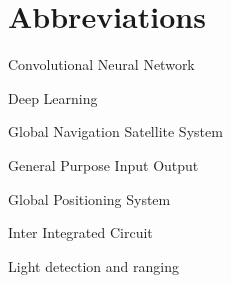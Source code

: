 \chapter*{Abbreviations}

\begin{description}
\setlength{\itemsep}{-11pt}
\setlength{\leftmargin}{900pt}

\item[CNN] Convolutional Neural Network

\item[DL] Deep Learning

\item[GNNS] Global Navigation Satellite System
\item[GPIO] General Purpose Input Output
\item[GPS] Global Positioning System

\item[I2C] Inter Integrated Circuit

\item[LIDAR] Light detection and ranging

\end{description}
